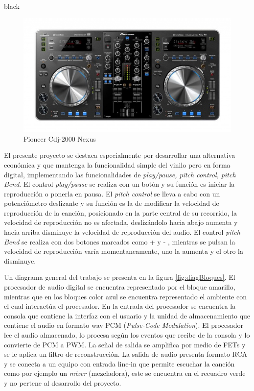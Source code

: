 \documentclass[11pt]{charter}
\begin{document}
\begin{consigna}{black}
\begin{figure}[htpb]
\centering 
\includegraphics[width=.7\textwidth]{./Figuras/reproductordigital.jpeg}
\caption{Pioneer Cdj-2000 Nexus}
\label{fig:Pioneer}
\end{figure}

El presente proyecto se destaca especialmente por desarrollar una alternativa económica y que mantenga la funcionalidad simple del vinilo pero en forma digital, implementando las funcionalidades de \textit{play/pause, pitch control, pitch Bend}. El control \textit{play/pause} se realiza con un botón y su función es iniciar la reproducción o ponerla en pausa. El \textit{pitch control} se lleva a cabo con un potenciómetro deslizante y su función es la de modificar la velocidad de reproducción de la canción, posicionado en la parte central de su recorrido, la velocidad de reproducción no es afectada, deslizándolo hacia abajo aumenta y hacia arriba disminuye la velocidad de reproducción del audio. El control \textit{ pitch Bend} se realiza con dos botones marcados como +  y - , mientras se pulsan la velocidad de reproducción varía momentaneamente, uno la aumenta y el otro la disminuye.

Un diagrama general del trabajo se presenta en la figura \ref{fig:diagBloques}. El procesador de audio digital se encuentra representado por el bloque amarillo, mientras que en los bloques color azul se encuentra representado el ambiente con el cual interactúa el procesador. En la entrada del procesador se encuentra la consola que contiene la interfaz con el usuario y la unidad de almacenamiento que contiene el audio en formato wav PCM (\textit{Pulse-Code Modulation}). El procesador lee el audio almacenado, lo procesa según los eventos que recibe de la consola y lo convierte de PCM a PWM. La señal de  salida se amplifica por medio de FETs y se le aplica un filtro de reconstrucción. La salida de audio presenta formato RCA y se conecta a un equipo con entrada line-in que permite escuchar la canción como por ejemplo un \textit{mixer} (mezcladora), este se encuentra en el recuadro verde y no pertene al desarrollo del proyecto. 


\end{consigna}
\end{document}
